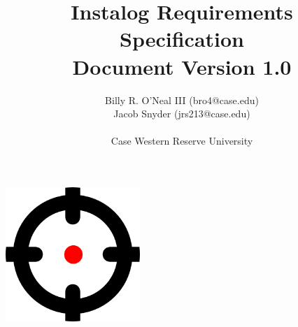\documentclass[letterpaper,12pt]{article}
\title{Instalog Requirements Specification \\
Document Version 1.0}
\author{
Billy R. O'Neal III (bro4@case.edu) \\
Jacob Snyder (jrs213@case.edu) \\ \\
Case Western Reserve University
}
\begin{document}
\maketitle
\vspace{1in}
\begin{center}
\includegraphics[width=2in, height=2in]{figures/InstalogLogo.png}
\end{center}
\newpage

\tableofcontents
\newpage


\newpage


\newpage


\newpage


\newpage


\newpage


\clearpage


\newpage


\end{document}
